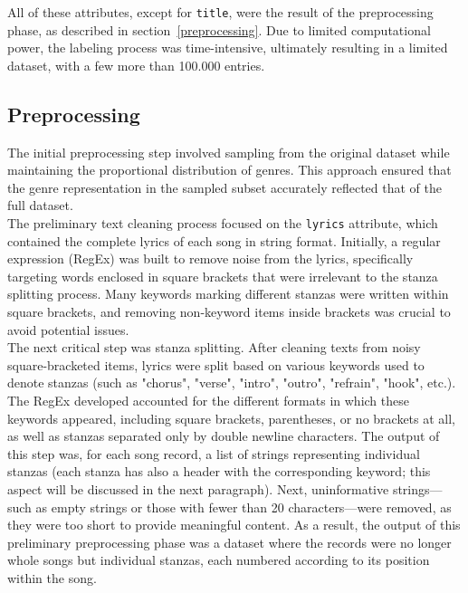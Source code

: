 All of these attributes, except for \texttt{title}, were the result
of the preprocessing phase, as described in section~\ref{preprocessing}.
Due to limited computational power, the labeling process was time-intensive,
ultimately resulting in a limited dataset, with a few more than 100.000 entries.

\subsection*{Preprocessing}
\label{preprocessing}
The initial preprocessing step involved sampling from the original dataset
while maintaining the proportional distribution of genres.
This approach ensured that the genre representation in the sampled subset
accurately reflected that of the full dataset.\\

The preliminary text cleaning process focused on the \texttt{lyrics} attribute,
which contained the complete lyrics of each song in string format.
Initially, a regular expression (RegEx) was built to remove noise from the
lyrics, specifically targeting words enclosed in square brackets that were
irrelevant to the stanza splitting process. Many keywords marking different
stanzas were written within square brackets, and removing non-keyword items
inside brackets was crucial to avoid potential issues.\\

The next critical step was stanza splitting. After cleaning texts from
noisy square-bracketed items, lyrics were split based on various keywords
used to denote stanzas (such as "chorus", "verse", "intro", "outro", "refrain", "hook", etc.).
The RegEx developed accounted for the different formats in which these keywords
appeared, including square brackets, parentheses, or no brackets at all, as well
as stanzas separated only by double newline characters.
The output of this step was, for each song record, a list of strings
representing individual stanzas (each stanza has also a header with the corresponding
keyword; this aspect will be discussed in the next paragraph).
Next, uninformative strings—such as empty strings or those with fewer
than 20 characters—were removed, as they were too short to provide meaningful
content.
As a result, the output of this preliminary preprocessing phase was a dataset
where the records were no longer whole songs but individual stanzas, each
numbered according to its position within the song.\\

